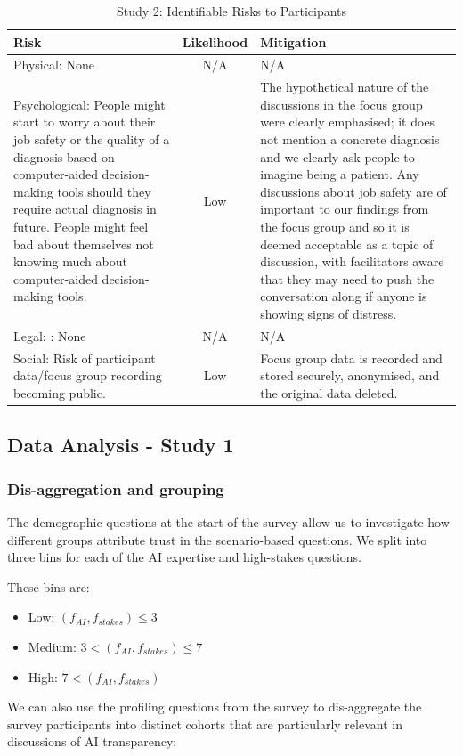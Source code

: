 \documentclass[manuscript,screen,review]{acmart}
\begin{document}
\begin{table}[h]
\begin{center}
\begin{tabular}{ | p{6cm} | c | p{6cm} |}
\hline
 Risk & Likelihood & Mitigation \\
 \hline
 \hline
 Physical: None & N/A & N/A \\
 \hline
 Psychological: People might start to worry about their job safety or the quality of a diagnosis based on computer-aided decision-making tools should they require actual diagnosis in future. People might feel bad about themselves not knowing much about computer-aided decision-making tools. & Low & The hypothetical nature of the discussions in the focus group were clearly emphasised; it does not mention a concrete diagnosis and we clearly ask people to imagine being a patient. Any discussions about job safety are of important to our findings from the focus group and so it is deemed acceptable as a topic of discussion, with facilitators aware that they may need to push the conversation along if anyone is showing signs of distress. \\
 \hline
 Legal: : None & N/A & N/A \\
 \hline
Social: Risk of participant data/focus group recording becoming public. & Low & Focus group data is recorded and stored securely, anonymised, and the original data deleted.\\
\hline
\end{tabular}
\caption{Study 2: Identifiable Risks to Participants}
\label{table:study2_risks}
\end{center}
\end{table}


\subsection{Data Analysis - Study 1}

\subsubsection{Dis-aggregation and grouping}

The demographic questions at the start of the survey allow us to investigate how different groups attribute trust in the scenario-based questions. We split into three bins for each of the AI expertise and high-stakes questions. 

These bins are:

\begin{itemize}
    \item Low: $(f_{AI}, f_{stakes}) \leq 3$
    \item Medium: $3 < (f_{AI}, f_{stakes}) \leq 7$
    \item High: $7 < (f_{AI}, f_{stakes})$
\end{itemize}
We can also use the profiling questions from the survey to dis-aggregate the survey participants into distinct cohorts that are particularly relevant in discussions of AI transparency: 
\end{document}
